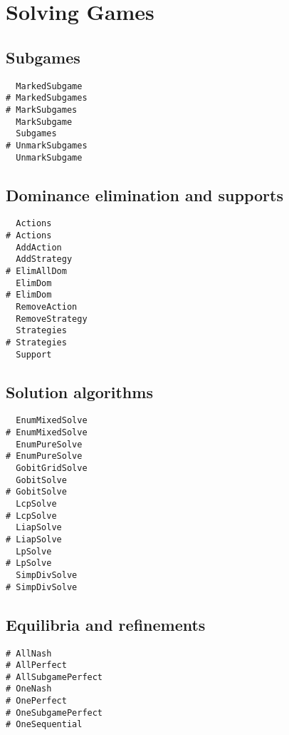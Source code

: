 \section{Solving Games}

\subsection{Subgames}

\begin{multicols}{3}
\begin{verbatim}
  MarkedSubgame 
# MarkedSubgames 
# MarkSubgames 
  MarkSubgame 
  Subgames 
# UnmarkSubgames 
  UnmarkSubgame 
\end{verbatim}
\end{multicols}

\subsection{Dominance elimination and supports}

\begin{multicols}{3}
\begin{verbatim}
  Actions
# Actions
  AddAction
  AddStrategy
# ElimAllDom 
  ElimDom 
# ElimDom 
  RemoveAction
  RemoveStrategy
  Strategies 
# Strategies 
  Support 
\end{verbatim}
\end{multicols}

\subsection{Solution algorithms}

\begin{multicols}{3}
\begin{verbatim}
  EnumMixedSolve 
# EnumMixedSolve 
  EnumPureSolve 
# EnumPureSolve 
  GobitGridSolve 
  GobitSolve 
# GobitSolve 
  LcpSolve 
# LcpSolve 
  LiapSolve 
# LiapSolve 
  LpSolve 
# LpSolve 
  SimpDivSolve 
# SimpDivSolve 
\end{verbatim}
\end{multicols}

\subsection{Equilibria and refinements}

\begin{multicols}{3}
\begin{verbatim}
# AllNash
# AllPerfect
# AllSubgamePerfect
# OneNash
# OnePerfect
# OneSubgamePerfect
# OneSequential
\end{verbatim}
\end{multicols}

